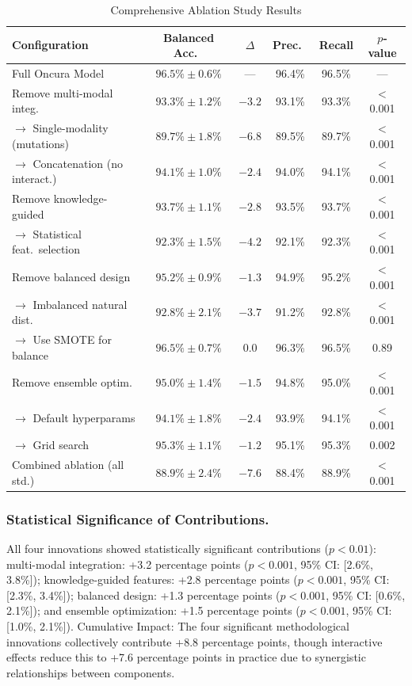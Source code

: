 \documentclass[manuscript, screen, review]{jair}
\begin{document}
\begin{table}[!t]
  \caption{Comprehensive Ablation Study Results}
  \label{tab:ablation}
  \centering
  \small
  \begin{tabular}{lccccc}
    \toprule
    Configuration & Balanced Acc.\ & $\Delta$ & Prec.\ & Recall & $p$-value \\
    \midrule
    Full Oncura Model            & $96.5\%\pm0.6\%$ & ---     & 96.4\% & 96.5\% & --- \\
    Remove multi-modal integ.\   & $93.3\%\pm1.2\%$ & $-3.2$  & 93.1\% & 93.3\% & $<$0.001 \\
    \quad$\to$ Single-modality (mutations) & $89.7\%\pm1.8\%$ & $-6.8$ & 89.5\% & 89.7\% & $<$0.001 \\
    \quad$\to$ Concatenation (no interact.) & $94.1\%\pm1.0\%$ & $-2.4$ & 94.0\% & 94.1\% & $<$0.001 \\
    Remove knowledge-guided      & $93.7\%\pm1.1\%$ & $-2.8$  & 93.5\% & 93.7\% & $<$0.001 \\
    \quad$\to$ Statistical feat.\ selection & $92.3\%\pm1.5\%$ & $-4.2$ & 92.1\% & 92.3\% & $<$0.001 \\
    Remove balanced design       & $95.2\%\pm0.9\%$ & $-1.3$  & 94.9\% & 95.2\% & $<$0.001 \\
    \quad$\to$ Imbalanced natural dist.\  & $92.8\%\pm2.1\%$ & $-3.7$ & 91.2\% & 92.8\% & $<$0.001 \\
    \quad$\to$ Use SMOTE for balance     & $96.5\%\pm0.7\%$ & $0.0$  & 96.3\% & 96.5\% & 0.89 \\
    Remove ensemble optim.\      & $95.0\%\pm1.4\%$ & $-1.5$  & 94.8\% & 95.0\% & $<$0.001 \\
    \quad$\to$ Default hyperparams       & $94.1\%\pm1.8\%$ & $-2.4$ & 93.9\% & 94.1\% & $<$0.001 \\
    \quad$\to$ Grid search               & $95.3\%\pm1.1\%$ & $-1.2$ & 95.1\% & 95.3\% & 0.002 \\
    Combined ablation (all std.) & $88.9\%\pm2.4\%$ & $-7.6$  & 88.4\% & 88.9\% & $<$0.001 \\
    \bottomrule
  \end{tabular}
\end{table}

\subsubsection{Statistical Significance of Contributions.}

All four innovations showed statistically significant contributions ($p < 0.01$): multi-modal integration: +3.2 percentage points ($p < 0.001$, 95\% CI: [2.6\%, 3.8\%]); knowledge-guided features: +2.8 percentage points ($p < 0.001$, 95\% CI: [2.3\%, 3.4\%]); balanced design: +1.3 percentage points ($p < 0.001$, 95\% CI: [0.6\%, 2.1\%]); and ensemble optimization: +1.5 percentage points ($p < 0.001$, 95\% CI: [1.0\%, 2.1\%]). Cumulative Impact: The four significant methodological innovations collectively contribute +8.8 percentage points, though interactive effects reduce this to +7.6 percentage points in practice due to synergistic relationships between components.
\end{document}
